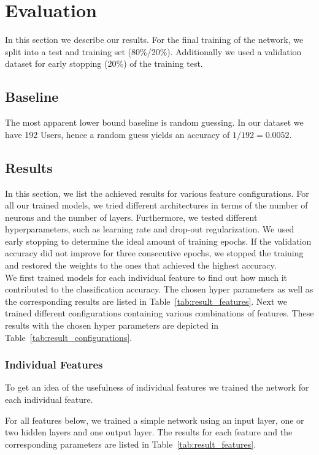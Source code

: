 \documentclass[acmsmall]{acmart}
\begin{document}
\section{Evaluation}
In this section we describe our results. For the final training of the network, we split into a test and training set (80\%/20\%). Additionally we used a validation dataset for early stopping (20\%) of the training test. 

\subsection{Baseline}
The most apparent lower bound baseline is random guessing. In our dataset we have 192 Users, hence a random guess yields an accuracy of $1/192 = 0.0052$. 

\subsection{Results}
In this section, we list the achieved results for various feature configurations. For all our trained models, we tried different architectures in terms of the number of neurons and the number of layers. Furthermore, we tested different hyperparameters, such as learning rate and drop-out regularization. We used early stopping to determine the ideal amount of training epochs. If the validation accuracy did not improve for three consecutive epochs, we stopped the training and restored the weights to the ones that achieved the highest accuracy. \\
We first trained models for each individual feature to find out how much it contributed to the classification accuracy. The chosen hyper parameters as well as the corresponding results are listed in Table~\ref{tab:result_features}. 
Next we trained different configurations containing various combinations of features. These results with the chosen hyper parameters are depicted in Table~\ref{tab:result_configurations}.

\subsubsection{Individual Features}
To get an idea of the usefulness of individual features we trained the network for each individual feature. 

For all features below, we trained a simple network using an input layer, one or two hidden layers and one output layer. 
The results for each feature and the corresponding parameters are listed in Table~\ref{tab:result_features}.
\end{document}

